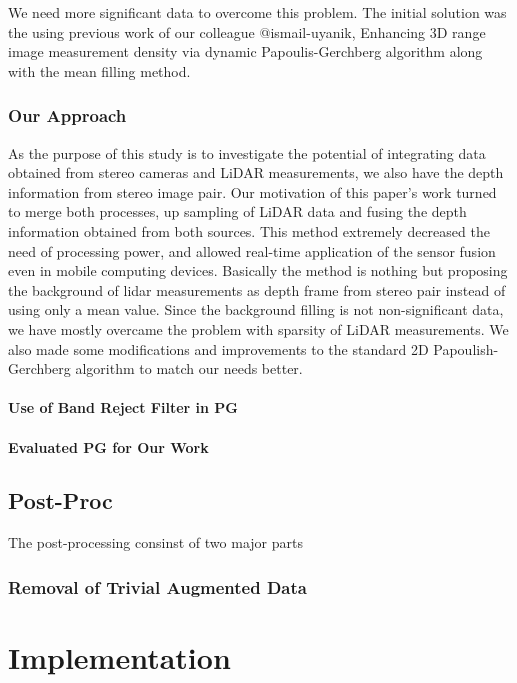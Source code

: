 \documentclass[conference]{IEEEtran}
\begin{document}
We need more significant data to overcome this problem. The initial solution was the using previous work of our colleague @ismail-uyanik, {Enhancing 3D range image measurement density via dynamic Papoulis-Gerchberg algorithm} along with the mean filling method.
\subsubsection{Our Approach}
As the purpose of this study is to investigate the potential of integrating data obtained from stereo cameras and LiDAR measurements, we also have the depth information from stereo image pair. Our motivation of this paper's work turned to merge both processes, up sampling of LiDAR data and fusing the depth information obtained from both sources. This method extremely decreased the need of processing power, and allowed real-time application of the sensor fusion even in mobile computing devices.
Basically the method is nothing but proposing the background of lidar measurements as depth frame from stereo pair instead of using only a mean value. Since the background filling is not non-significant data, we have mostly overcame the problem with sparsity of LiDAR measurements.
We also made some modifications and improvements to the standard 2D Papoulish-Gerchberg algorithm to match our needs better.
\paragraph{Use of Band Reject Filter in PG}
\paragraph{Evaluated PG for Our Work}

\subsection{Post-Proc}

The post-processing consinst of two major parts 

\subsubsection{Removal of Trivial Augmented Data}

\section{Implementation} \label{implementation}
\end{document}
